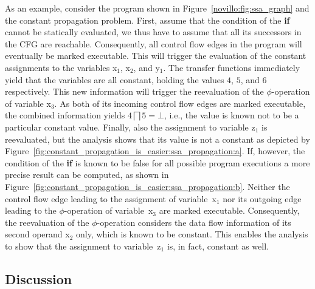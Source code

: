 As an example, consider the program shown in Figure~\ref{novillo:fig:ssa_graph}
and the constant propagation problem. First,
assume that the condition of the \textbf{if} cannot be statically evaluated, we
thus have to assume that all its successors in the CFG are reachable.
Consequently, all control flow edges in the program will eventually be marked
executable. This will trigger the evaluation of the constant assignments to
the variables x$_1$,  x$_2$, and y$_1$. The transfer functions immediately yield
that the variables are all constant, holding the values $4$, $5$, and $6$
respectively. This new information will trigger the reevaluation of the
$\phi$-operation of variable x$_3$. As both of its incoming control flow edges
are marked executable, the combined information yields $4 \bigsqcap 5 = \bot$,
i.e., the value is known not to be a particular constant value. Finally, also
the assignment
to variable z$_1$ is reevaluated, but the analysis shows that its value is not a
constant as depicted by Figure~\ref{fig:constant_propagation_is_easier:ssa_propagation:a}. If, however,
the condition of the \textbf{if} is known to be false for all possible program
executions a more precise result can be computed, as shown in
Figure~\ref{fig:constant_propagation_is_easier:ssa_propagation:b}.
Neither the control flow edge leading to the
assignment of variable~x$_1$ nor its outgoing edge leading
to the $\phi$-operation of variable~x$_3$ are marked executable.
Consequently, the reevaluation of
the $\phi$-operation considers the data flow information of its second operand
x$_2$ only, which is known to be constant. This enables the analysis
to show that the assignment to variable~z$_1$ is, in fact, constant as well.

\subsection{Discussion}

